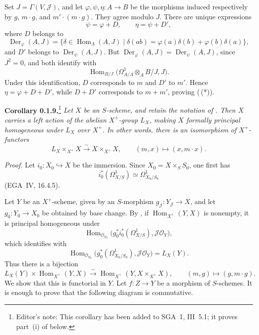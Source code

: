 Set \(J=\Gamma(V,\mathscr J)\), and let
\(\varphi,\psi,\eta:A\to B\) be the morphisms induced respectively by
\(g\), \(m\cdot g\), and \(m'\cdot(m\cdot g)\). They agree modulo
\(J\). There are unique expressions
\[
 \psi=\varphi+D,
 \qquad
 \eta=\psi+D',
\]
where \(D\) belongs to
\[
 \operatorname{Der}_{\varphi}(A,J)
 =\{\delta\in\operatorname{Hom}_{\Lambda}(A,J)
   \mid \delta(ab)=\varphi(a)\delta(b)+\varphi(b)\delta(a)\},
\]
and \(D'\) belongs to \(\operatorname{Der}_{\psi}(A,J)\). But
\(\operatorname{Der}_{\varphi}(A,J)
 =\operatorname{Der}_{\psi}(A,J)\), since \(J^2=0\), and both identify
with
\[
 \operatorname{Hom}_{B/J}
 \bigl(\Omega^1_{A/\Lambda}\otimes_AB/J,J\bigr).
\]
Under this identification, \(D\) corresponds to \(m\) and \(D'\) to
\(m'\). Hence \(\eta=\varphi+D+D'\), while \(D+D'\) corresponds to
\(m+m'\), proving (\,(*)).

\medskip
\noindent{}\textbf{Corollary 0.1.9.}\footnote{Editor's note: This
corollary has been added to SGA~1, III~5.1; it proves part~(i) of
 below.}
\textit{Let \(X\) be an \(S\)-scheme, and retain the notation of
. Then \(X\) carries a left action of the abelian
\(X^+\)-group \(L_X\), making \(X\) formally principal homogeneous
under \(L_X\) over \(X^+\). In other words, there is an isomorphism of
\(X^+\)-functors}
\[
 L_X\times_{X^+}X\xrightarrow{\sim}X\times_{X^+}X,
 \qquad
 (m,x)\longmapsto(x,m\cdot x).
\]

\noindent\textit{Proof.}
Let \(i_0:X_0\hookrightarrow X\) be the immersion. Since
\(X_0=X\times_SS_0\), one first has
\[
 i_0^*(\Omega^1_{X/S})\simeq\Omega^1_{X_0/S_0}
\]
(EGA~IV, 16.4.5).

Let \(Y\) be an \(X^+\)-scheme, given by an \(S\)-morphism
\(g_{\mathscr J}:Y_{\mathscr J}\to X\), and let
\(g_0:Y_0\to X_0\) be obtained by base change. By , if
\(\operatorname{Hom}_{X^+}(Y,X)\) is nonempty, it is principal
homogeneous under
\[
 \operatorname{Hom}_{\mathscr O_{Y_0}}
 \bigl(g_0^*i_0^*(\Omega^1_{X/S}),\mathscr J\mathscr O_Y\bigr),
\]
which identifies with
\[
 \operatorname{Hom}_{\mathscr O_{Y_0}}
 \bigl(g_0^*(\Omega^1_{X_0/S_0}),\mathscr J\mathscr O_Y\bigr)
 =L_X(Y).
\]
Thus there is a bijection
\[
 L_X(Y)\times\operatorname{Hom}_{X^+}(Y,X)
 \xrightarrow{\sim}
 \operatorname{Hom}_{X^+}(Y,X\times_{X^+}X),
 \qquad
 (m,g)\longmapsto(g,m\cdot g).
\]
We show that this is functorial in \(Y\). Let \(f:Z\to Y\) be a
morphism of \(S\)-schemes. It is enough to prove that the following
diagram is commutative.

